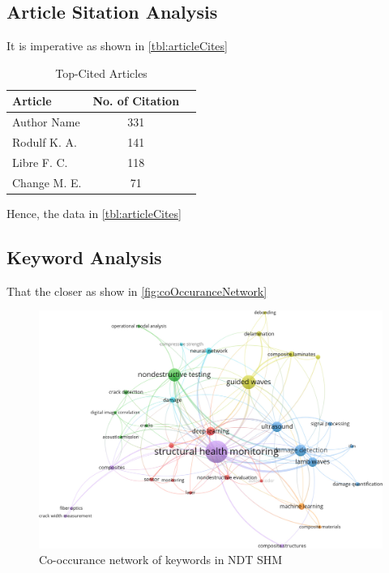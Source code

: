 \documentclass[journal, a4paper]{IEEEtran}
\begin{document}
\subsection{Article Sitation Analysis}
It is imperative as shown in \autoref{tbl:articleCites} \lipsum[1]

\begin{table}[htbp]

  \centering
  \caption{Top-Cited Articles}
  \label{tbl:articleCites}
  \begin{tabular}{lcc}

      \toprule
      \textbf{Article} & \textbf{No. of Citation} \\
      \midrule
      Author Name       \cite{}           &    331         \\
      Rodulf K. A.      \cite{}      &    141         \\
      Libre F. C.       \cite{}     &    118         \\
      Change M. E.      \cite{}          &    71          \\
      \bottomrule
  \end{tabular}
\end{table}

Hence, the data in \autoref{tbl:articleCites} \lipsum[1]



\subsection{Keyword Analysis}
That the closer as show in \autoref{fig:coOccuranceNetwork} \lipsum[1]

\begin{figure}[h]
  \centering
  \includegraphics[width=\columnwidth]{./img/co_occurance_network.jpg}
  \caption{Co-occurance network of keywords in NDT SHM}
  \label{fig:coOccuranceNetwork}
\end{figure}
\end{document}
